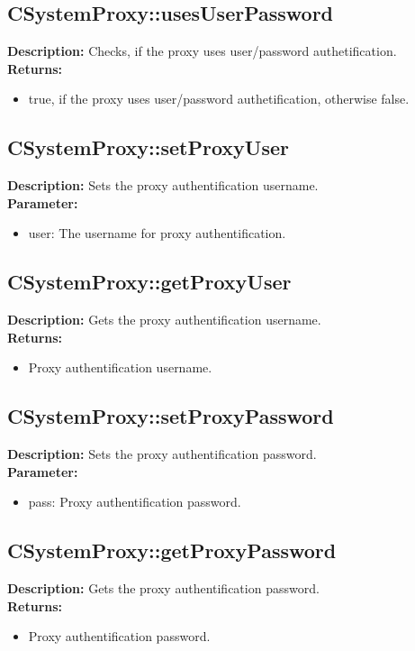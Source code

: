 \subsection{CSystemProxy::usesUserPassword}
\textbf{Description:} Checks, if the proxy uses user/password authetification.\\
\textbf{Returns:}
\begin{itemize}
\item true, if the proxy uses user/password authetification, otherwise false.
\end{itemize}

\subsection{CSystemProxy::setProxyUser}
\textbf{Description:} Sets the proxy authentification username.\\
\textbf{Parameter:}
\begin{itemize}
\item user: The username for proxy authentification.
\end{itemize}

\subsection{CSystemProxy::getProxyUser}
\textbf{Description:} Gets the proxy authentification username.\\
\textbf{Returns:}
\begin{itemize}
\item Proxy authentification username.
\end{itemize}

\subsection{CSystemProxy::setProxyPassword}
\textbf{Description:} Sets the proxy authentification password.\\
\textbf{Parameter:}
\begin{itemize}
\item pass: Proxy authentification password.
\end{itemize}

\subsection{CSystemProxy::getProxyPassword}
\textbf{Description:} Gets the proxy authentification password.\\
\textbf{Returns:}
\begin{itemize}
\item Proxy authentification password.
\end{itemize}


